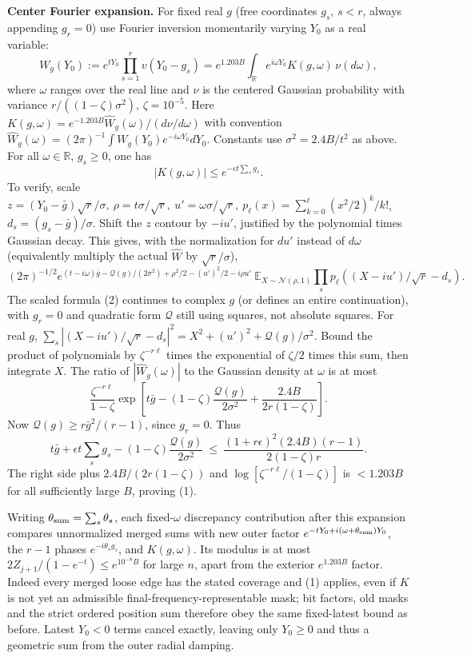 \documentclass[11pt]{article}
\begin{document}
\textbf{Center Fourier expansion.} For fixed real \(g\) (free coordinates \(g_s,\,s<r\), always appending \(g_r=0\)) use Fourier inversion momentarily varying \(Y_0\) as a real variable:
\[
 W_g(Y_0):=e^{t Y_0}\prod_{s=1}^r v(Y_0-g_s) = e^{1.203 B}\int_{\mathbb R} e^{i\omega Y_0} K(g,\omega)\,\nu(d\omega),
\]
where \(\omega\) ranges over the real line and \(\nu\) is the centered Gaussian probability with variance \(r/((1-\zeta)\sigma^2)\), \(\zeta=10^{-5}\). Here \(K(g,\omega)=e^{-1.203B}\widehat W_g(\omega)/(d\nu/d\omega)\) with convention \(\widehat W_g(\omega)=(2\pi)^{-1}\int W_g(Y_0)e^{-i\omega Y_0}dY_0\). Constants use \(\sigma^2=2.4 B/t^2\) as above. For all \(\omega\in\mathbb R\), \(g_s\ge0\), one has
\[
 |K(g,\omega)|\le e^{-\epsilon t\sum_s g_s}.
 \tag{1}
\]
To verify, scale \(z=(Y_0-\bar g)\sqrt r/\sigma,\ \rho=t\sigma/\sqrt r,\ u'=\omega\sigma/\sqrt r,\ p_\ell(x)=\sum_{k=0}^{\ell}(x^2/2)^k/k!\), \(d_s=(g_s-\bar g)/\sigma\). Shift the \(z\) contour by \(-i u'\), justified by the polynomial times Gaussian decay. This gives, with the normalization for \(du'\) instead of \(d\omega\) (equivalently multiply the actual \(\widehat W\) by \(\sqrt r/\sigma\)),
\[
 (2\pi)^{-1/2}
 e^{(t-i\omega)\bar g-\mathcal{Q}(g)/(2\sigma^2)+\rho^2/2-(u')^2/2-i\rho u'}
 \ \mathbb E_{X\sim\mathcal N(\rho,1)}
 \prod_s p_\ell((X-i u')/\sqrt r-d_s).
 \tag{2}
\]
The scaled formula (2) continues to complex \(g\) (or defines an entire continuation), with \(g_r=0\) and quadratic form \(\mathcal{Q}\) still using squares, not absolute squares. For real \(g\), \(\sum_s|(X-i u')/\sqrt r-d_s|^2=X^2+(u')^2+\mathcal{Q}(g)/\sigma^2\). Bound the product of polynomials by \(\zeta^{-r\ell}\) times the exponential of \(\zeta/2\) times this sum, then integrate \(X\). The ratio of \(|\widehat W_g(\omega)|\) to the Gaussian density at \(\omega\) is at most
\[
 \frac{\zeta^{-r\ell}}{1-\zeta}
 \exp\!\left[t\bar g-(1-\zeta)\frac{\mathcal{Q}(g)}{2\sigma^2}
            +\frac{2.4B}{2r(1-\zeta)}\right].
 \tag{3}
\]
Now \(\mathcal{Q}(g)\ge r\bar g^2/(r-1)\), since \(g_r=0\). Thus
\[
 t\bar g+\epsilon t \sum_s g_s-(1-\zeta)\frac{\mathcal{Q}(g)}{2\sigma^2}
 \ \le\ \frac{(1+r\epsilon)^2(2.4 B)(r-1)}{2(1-\zeta)r}.
\]
The right side plus \(2.4B/(2r(1-\zeta))\) and \(\log[\zeta^{-r\ell}/(1-\zeta)]\) is \(<1.203B\) for all sufficiently large \(B\), proving (1).

Writing \(\theta_{\rm sum}=\sum_s\theta_s\), each fixed-\(\omega\) discrepancy contribution after this expansion compares unnormalized merged sums with new outer factor \(e^{-t Y_0+i(\omega+\theta_{\rm sum})Y_0}\), the \(r-1\) phases \(e^{-i\theta_sg_s}\), and \(K(g,\omega)\). Its modulus is at most \(2Z_{j+1}/(1-e^{-t})\le e^{10^{-8} B}\) for large \(n\), apart from the exterior \(e^{1.203B}\) factor. Indeed every merged loose edge has the stated coverage and (1) applies, even if \(K\) is not yet an admissible final-frequency-representable mask; bit factors, old masks and the strict ordered position sum therefore obey the same fixed-latest bound as before. Latest \(Y_0<0\) terms cancel exactly, leaving only \(Y_0\ge0\) and thus a geometric sum from the outer radial damping.
\end{document}
